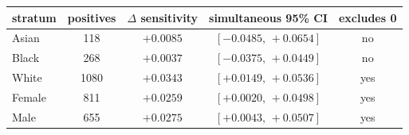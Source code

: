 \begin{tabular}{lcccc}
\toprule
stratum & positives & $\Delta$ sensitivity & simultaneous 95\% CI & excludes 0 \\
\midrule
Asian & 118 & $+0.0085$ & $[-0.0485,\,+0.0654]$ & no \\
Black & 268 & $+0.0037$ & $[-0.0375,\,+0.0449]$ & no \\
White & 1080 & $+0.0343$ & $[+0.0149,\,+0.0536]$ & yes \\
Female & 811 & $+0.0259$ & $[+0.0020,\,+0.0498]$ & yes \\
Male & 655 & $+0.0275$ & $[+0.0043,\,+0.0507]$ & yes \\
\bottomrule
\end{tabular}
